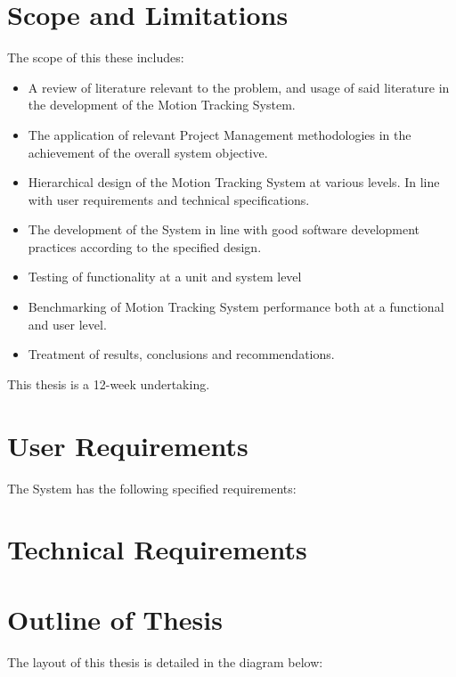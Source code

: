 \section{Scope and Limitations}
The scope of this these includes: 
\begin{itemize}
    \item A review of literature relevant to the problem, and usage of
        said literature in the development of the Motion Tracking System.
    \item The application of relevant Project Management methodologies in the
        achievement of the overall system objective.
    \item Hierarchical design of the Motion Tracking System at various levels.
        In line with user requirements and technical specifications.
    \item The development of the System in line with good software development
        practices according to the specified design.
    \item Testing of functionality at a unit and system level
    \item Benchmarking of Motion Tracking System performance both at a
        functional and user level.
    \item Treatment of results, conclusions and recommendations.
\end{itemize}

This thesis is a 12-week undertaking.

\section{User Requirements}
The System has the following specified requirements:

\section{Technical Requirements}


\section{Outline of Thesis}
The layout of this thesis is detailed in the diagram below:


